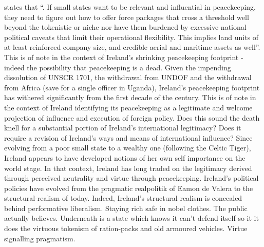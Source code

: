 \parencite{FLYNN_2019} states that ``. If small states want to be relevant and influential in peacekeeping,  they need to figure out how to offer force packages that cross a threshold well beyond the  tokenistic or niche nor have them burdened by excessive national political caveats that limit their operational flexibility. This implies land units of at least reinforced company size, and  credible aerial and maritime assets as well''. This is of note in the context of Ireland's shrinking peacekeeping footprint - indeed the possibility that peacekeeping is a dead. Given the impending dissolution of UNSCR 1701, the withdrawal from UNDOF and the withdrawal from Africa (save for a single officer in Uganda), Ireland's peacekeeping footprint has withered significantly from the first decade of the century. This is of note in the context of Ireland identifying its peacekeeping as a legitimate and welcome projection of influence and execution of foreign policy. Does this sound the death knell for a substantial portion of Ireland's international legitimacy? Does it require a revision of Ireland's ways and means of international influence? Since evolving from a poor small state to a wealthy one (following the Celtic Tiger), Ireland appears to have developed notions of her own self importance on the world stage. In that context, Ireland has long traded on the legitimacy derived through perceived neutrality and virtue through peacekeeping. Ireland's political policies have evolved from the pragmatic realpolitik of Eamon de Valera to the structural-realism of today. Indeed, Ireland's structural realism is concealed behind performative liberalism. Staying rich safe in nobel clothes. The public actually believes. Underneath is a state which knows it can't defend itself so it it does the virtuous tokenism of ration-packs and old armoured vehicles. Virtue signalling pragmatism.
                                                                                                                              
